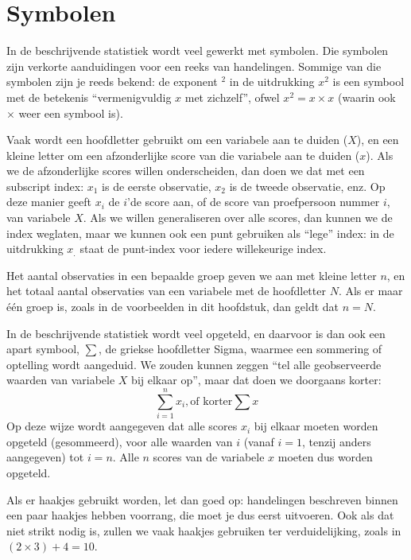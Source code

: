 \documentclass[
]{book}
\begin{document}
\hypertarget{symbolen}{%
\section{Symbolen}\label{symbolen}}

In de beschrijvende statistiek wordt veel gewerkt met symbolen. Die
symbolen zijn verkorte aanduidingen voor een reeks van handelingen.
Sommige van die symbolen zijn je reeds bekend: de exponent \({}^2\) in de
uitdrukking \(x^2\) is een symbool met de betekenis ``vermenigvuldig \(x\)
met zichzelf'', ofwel \(x^2 = x \times x\) (waarin ook \(\times\) weer een
symbool is).

Vaak wordt een hoofdletter gebruikt om een variabele aan te duiden
(\(X\)), en een kleine letter om een afzonderlijke score van die variabele
aan te duiden (\(x\)). Als we de afzonderlijke scores willen
onderscheiden, dan doen we dat met een subscript index: \(x_1\) is de
eerste observatie, \(x_2\) is de tweede observatie, enz. Op deze manier
geeft \(x_i\) de \(i\)'de score aan, of de score van proefpersoon nummer
\(i\), van variabele \(X\). Als we willen generaliseren over alle scores,
dan kunnen we de index weglaten, maar we kunnen ook een punt gebruiken
als ``lege'' index: in de uitdrukking \(x_.\) staat de punt-index voor
iedere willekeurige index.

Het aantal observaties in een bepaalde groep geven we aan met kleine
letter \(n\), en het totaal aantal observaties van een variabele met de
hoofdletter \(N\). Als er maar één groep is, zoals in de voorbeelden in
dit hoofdstuk, dan geldt dat \(n=N\).

In de beschrijvende statistiek wordt veel opgeteld, en daarvoor is dan
ook een apart symbool, \(\sum\), de griekse hoofdletter Sigma, waarmee een
sommering of optelling wordt aangeduid. We zouden kunnen zeggen ``tel
alle geobserveerde waarden van variabele \(X\) bij elkaar op'', maar dat
doen we doorgaans korter:
\[\sum\limits_{i=1}^n x_i, \textrm{of korter} \sum x
\]
Op deze wijze
wordt aangegeven dat alle scores \(x_i\) bij elkaar moeten worden opgeteld
(gesommeerd), voor alle waarden van \(i\) (vanaf \(i=1\), tenzij anders
aangegeven) tot \(i=n\). Alle \(n\) scores van de variabele \(x\) moeten dus
worden opgeteld.

Als er haakjes gebruikt worden, let dan goed op: handelingen beschreven
binnen een paar haakjes hebben voorrang, die moet je dus eerst
uitvoeren. Ook als dat niet strikt nodig is, zullen we vaak haakjes
gebruiken ter verduidelijking, zoals in \((2\times3)+4=10\).
\end{document}
